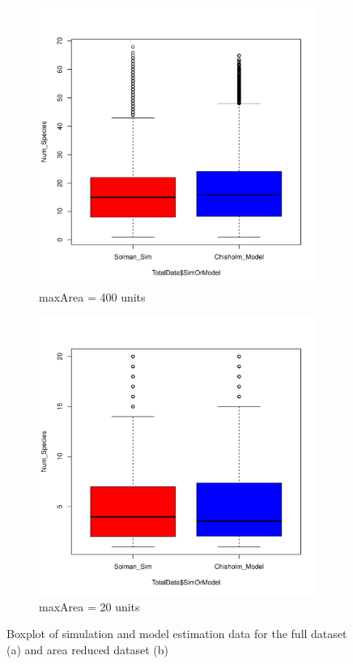 \documentclass{article}
\begin{document}
\begin{figure}[h!]
  \centering
  \begin{subfigure}[b]{0.4\linewidth}
    \includegraphics[width=\linewidth]{../../../Results/Simulation2/SolmanChisholmBoxplot_1.pdf}
    \caption{maxArea = 400 units}
  \end{subfigure}
  \begin{subfigure}[b]{0.4\linewidth}
    \includegraphics[width=\linewidth]{../../../Results/Simulation2/SolmanChisholmBoxplot_20.pdf}
    \caption{maxArea = 20 units}
  \end{subfigure}
  \caption{Boxplot of simulation and model estimation data for the full dataset (a) and area reduced dataset (b)}
  \label{fig:boxplots}
\end{figure}
\end{document}
